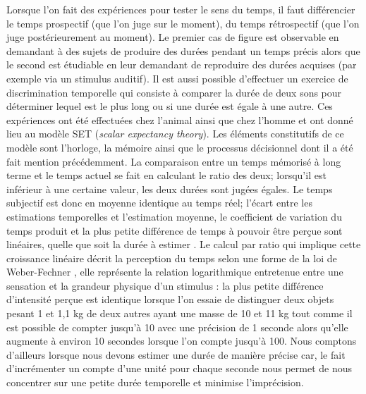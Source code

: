 \documentclass[12pt,fleqn,oneside,french,openany]{book} %
\begin{document}
Lorsque l'on fait des expériences pour tester le sens du temps, il faut différencier le temps prospectif (que l'on juge sur le moment), du temps rétrospectif (que l'on juge postérieurement au moment). Le premier cas de figure est observable en demandant à des sujets de produire des durées pendant un temps précis alors que le second est étudiable en leur demandant de reproduire des durées acquises (par exemple via un stimulus auditif). Il est aussi possible d'effectuer un exercice de discrimination temporelle qui consiste à comparer la durée de deux sons pour déterminer lequel est le plus long ou si une durée est égale à une autre. Ces expériences ont été effectuées chez l'animal \cite{jasselette} ainsi que chez l'homme \cite{gibbon1984} et ont donné lieu au modèle SET (\emph{scalar expectancy theory}). Les éléments constitutifs de ce modèle sont l'horloge, la mémoire ainsi que le processus décisionnel dont il a été fait mention précédemment. La comparaison entre un temps mémorisé à long terme et le temps actuel se fait en calculant le ratio des deux; lorsqu'il est inférieur à une certaine valeur, les deux durées sont jugées égales. Le temps subjectif est donc en moyenne identique au temps réel; l'écart entre les estimations temporelles et l'estimation moyenne, le coefficient de variation du temps produit et la plus petite différence de temps à pouvoir être perçue sont linéaires, quelle que soit la durée à estimer \cite{set}. Le calcul par ratio qui implique cette croissance linéaire décrit la perception du temps selon une forme de la loi de Weber-Fechner \cite{gibbon1984,wearden1988}, elle représente la relation logarithmique entretenue entre une sensation et la grandeur physique d'un stimulus : la plus petite différence d'intensité perçue est identique lorsque l'on essaie de distinguer deux objets pesant 1 et 1,1 kg de deux autres ayant une masse de 10 et 11 kg \cite{weber} tout comme il est possible de compter jusqu'à 10 avec une précision de 1 seconde alors qu'elle augmente à environ 10 secondes lorsque l'on compte jusqu'à 100. Nous comptons d'ailleurs lorsque nous devons estimer une durée de manière précise car, le fait d'incrémenter un compte d'une unité pour chaque seconde nous permet de nous concentrer sur une petite durée temporelle et minimise l'imprécision.

\begin{figure}[h]
\end{figure}
\end{document}
